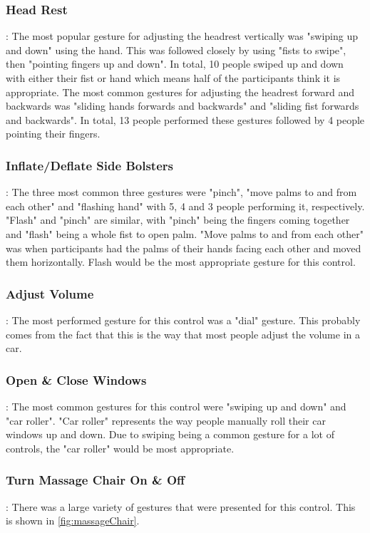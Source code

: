 \documentclass{l4proj}
\begin{document}
\subsubsection{Head Rest}: The most popular gesture for adjusting the headrest vertically was "swiping up and down" using the hand. This was followed closely by using "fists to swipe", then "pointing fingers up and down". In total, 10 people swiped up and down with either their fist or hand which means half of the participants think it is appropriate. The most common gestures for adjusting the headrest forward and backwards was "sliding hands forwards and backwards" and "sliding fist forwards and backwards". In total, 13 people performed these gestures followed by 4 people pointing their fingers. 
\subsubsection{Inflate/Deflate Side Bolsters}: The three most common three gestures were "pinch", "move palms to and from each other" and "flashing hand" with 5, 4 and 3 people performing it, respectively. "Flash" and "pinch" are similar, with "pinch" being the fingers coming together and "flash" being a whole fist to open palm. "Move palms to and from each other" was when participants had the palms of their hands facing each other and moved them horizontally. Flash would be the most appropriate gesture for this control.
\subsubsection{Adjust Volume}: The most performed gesture for this control was a "dial" gesture. This probably comes from the fact that this is the way that most people adjust the volume in a car.  
\subsubsection{Open \& Close Windows}: The most common gestures for this control were "swiping up and down" and "car roller". "Car roller" represents the way people manually roll their car windows up and down. Due to swiping being a common gesture for a lot of controls, the "car roller" would be most appropriate.
\subsubsection{Turn Massage Chair On \& Off}: There was a large variety of gestures that were presented for this control. This is shown in \ref{fig:massageChair}.
\end{document}
